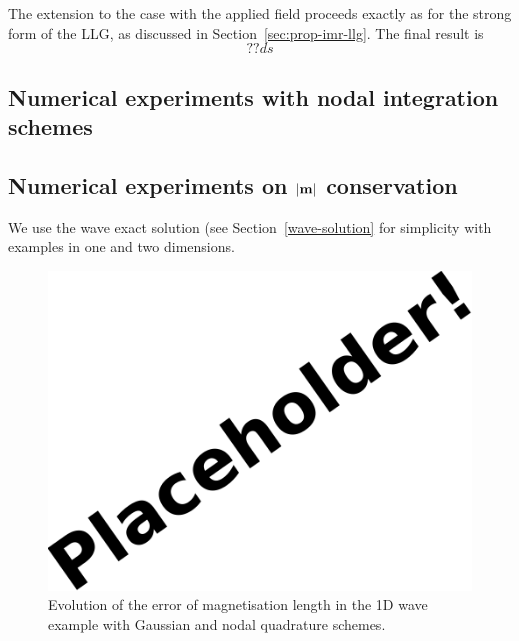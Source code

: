 The extension to the case with the applied field proceeds exactly as for the strong form of the LLG, as discussed in Section~\ref{sec:prop-imr-llg}.
The final result is
\begin{equation}
  ??ds
\end{equation}

\subsection{Numerical experiments with nodal integration schemes}


\subsection{Numerical experiments on $\left|{\mathbf{m}} \right|$ conservation}

We use the wave exact solution (see Section~\ref{wave-solution} for simplicity with examples in one and two dimensions.

\begin{figure}[ht!]
  \centering
  \includegraphics{images/placeholder}
  \caption{Evolution of the error of magnetisation length in the 1D wave example with Gaussian and nodal quadrature schemes.}
  \label{fig:mean-ml-error-1d}
\end{figure}

